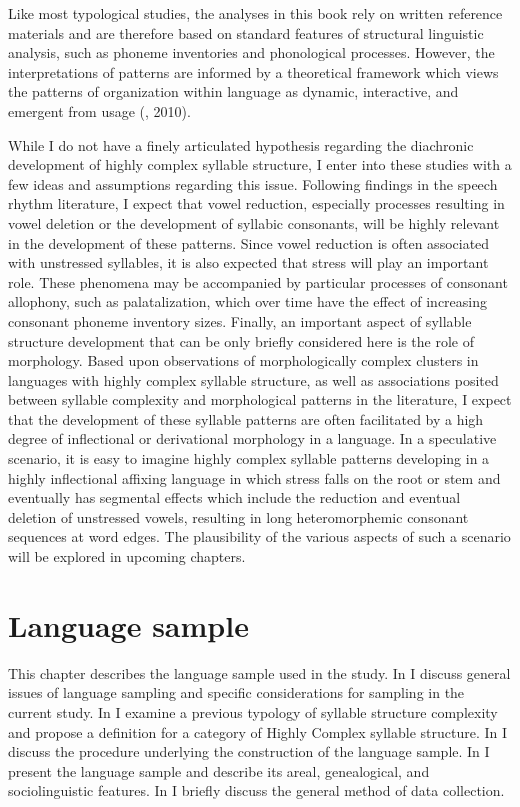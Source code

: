   Like most typological studies, the analyses in this book rely on written reference materials and are therefore based on standard features of structural linguistic analysis, such as phoneme inventories and phonological processes. However, the interpretations of patterns are informed by a theoretical framework which views the patterns of organization within language as dynamic, interactive, and emergent from usage (\citealt{BecknerEtAl2009,Bybee2001}, 2010).

  While I do not have a finely articulated hypothesis regarding the diachronic development of highly complex syllable structure, I enter into these studies with a few ideas and assumptions regarding this issue. Following findings in the speech rhythm literature, I expect that vowel reduction, especially processes resulting in vowel deletion or the development of syllabic consonants, will be highly relevant in the development of these patterns. Since vowel reduction is often associated with unstressed syllables, it is also expected that stress will play an important role. These phenomena may be accompanied by particular processes of consonant allophony, such as palatalization, which over time have the effect of increasing consonant phoneme inventory sizes. Finally, an important aspect of syllable structure development that can be only briefly considered here is the role of morphology. Based upon observations of morphologically complex clusters in languages with highly complex syllable structure, as well as associations posited between syllable complexity and morphological patterns in the literature, I expect that the development of these syllable patterns are often facilitated by a high degree of inflectional or derivational morphology in a language. In a speculative scenario, it is easy to imagine highly complex syllable patterns developing in a highly inflectional affixing language in which stress falls on the root or stem and eventually has segmental effects which include the reduction and eventual deletion of unstressed vowels, resulting in long heteromorphemic consonant sequences at word edges. The plausibility of the various aspects of such a scenario will be explored in upcoming chapters.

\chapter{Language sample}\label{sec:2}

  This chapter describes the language sample used in the study. In  I discuss general issues of language sampling and specific considerations for sampling in the current study. In  I examine a previous typology of syllable structure complexity and propose a definition for a category of Highly Complex syllable structure. In  I discuss the procedure underlying the construction of the language sample. In  I present the language sample and describe its areal, genealogical, and sociolinguistic features. In  I briefly discuss the general method of data collection.

